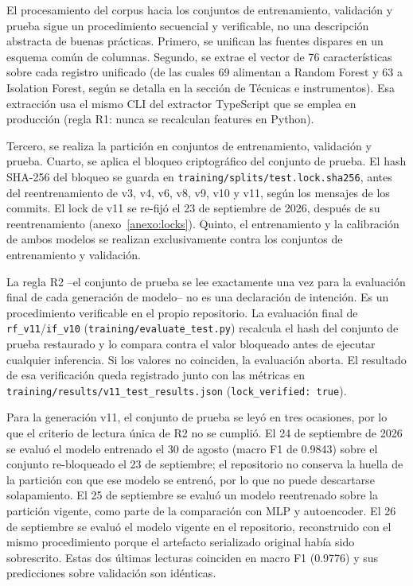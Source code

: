 El procesamiento del corpus hacia los conjuntos de entrenamiento, validación y prueba sigue un procedimiento secuencial y verificable, no una descripción abstracta de buenas prácticas. Primero, se unifican las fuentes dispares en un esquema común de columnas. Segundo, se extrae el vector de 76 características sobre cada registro unificado (de las cuales 69 alimentan a Random Forest y 63 a Isolation Forest, según se detalla en la sección de Técnicas e instrumentos). Esa extracción usa el mismo CLI del extractor TypeScript que se emplea en producción (regla R1: nunca se recalculan features en Python).

Tercero, se realiza la partición en conjuntos de entrenamiento, validación y prueba. Cuarto, se aplica el bloqueo criptográfico del conjunto de prueba. El hash SHA-256 del bloqueo se guarda en \texttt{training/splits/test.lock.sha256}, antes del reentrenamiento de v3, v4, v6, v8, v9, v10 y v11, según los mensajes de los commits. El lock de v11 se re-fijó el 23 de septiembre de 2026, después de su reentrenamiento (anexo~\ref{anexo:locks}). Quinto, el entrenamiento y la calibración de ambos modelos se realizan exclusivamente contra los conjuntos de entrenamiento y validación.

La regla R2 --el conjunto de prueba se lee exactamente una vez para la evaluación final de cada generación de modelo-- no es una declaración de intención. Es un procedimiento verificable en el propio repositorio. La evaluación final de \texttt{rf\_v11}/\texttt{if\_v10} (\texttt{training/evaluate\_test.py}) recalcula el hash del conjunto de prueba restaurado y lo compara contra el valor bloqueado antes de ejecutar cualquier inferencia. Si los valores no coinciden, la evaluación aborta. El resultado de esa verificación queda registrado junto con las métricas en \texttt{training/results/v11\_test\_results.json} (\texttt{lock\_verified: true}).

Para la generación v11, el conjunto de prueba se leyó en tres ocasiones, por lo que el criterio de lectura única de R2 no se cumplió. El 24 de septiembre de 2026 se evaluó el modelo entrenado el 30 de agosto (macro F1 de 0.9843) sobre el conjunto re-bloqueado el 23 de septiembre; el repositorio no conserva la huella de la partición con que ese modelo se entrenó, por lo que no puede descartarse solapamiento. El 25 de septiembre se evaluó un modelo reentrenado sobre la partición vigente, como parte de la comparación con MLP y autoencoder. El 26 de septiembre se evaluó el modelo vigente en el repositorio, reconstruido con el mismo procedimiento porque el artefacto serializado original había sido sobrescrito. Estas dos últimas lecturas coinciden en macro F1 (0.9776) y sus predicciones sobre validación son idénticas.

